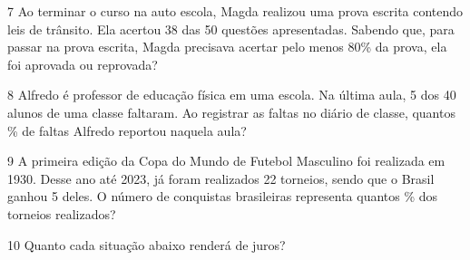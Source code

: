 


\num{7} Ao terminar o curso na auto escola, Magda realizou uma prova escrita
contendo leis de trânsito. Ela acertou 38 das 50 questões apresentadas.
Sabendo que, para passar na prova escrita, Magda precisava acertar pelo
menos 80\% da prova, ela foi aprovada ou reprovada?




\num{8} Alfredo é professor de educação física em uma escola. Na última aula,
5 dos 40 alunos de uma classe faltaram. Ao registrar as faltas no diário
de classe, quantos \% de faltas Alfredo reportou naquela aula?




\num{9} A primeira edição da Copa do Mundo de Futebol Masculino foi realizada
em 1930. Desse ano até 2023, já foram realizados 22 torneios, sendo que
o Brasil ganhou 5 deles. O número de conquistas brasileiras representa
quantos \% dos torneios realizados?





\num{10} Quanto cada situação abaixo renderá de juros?







